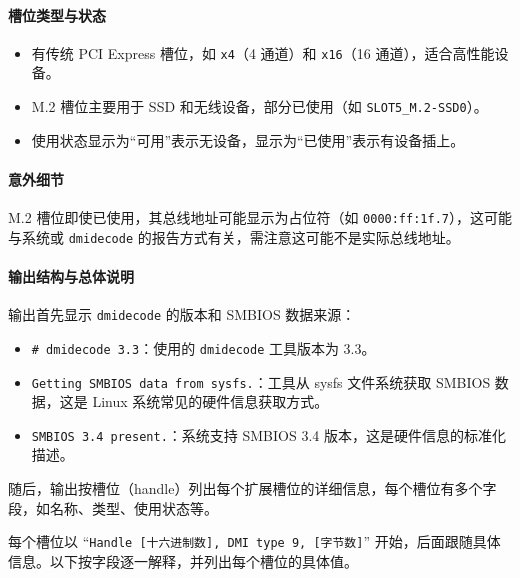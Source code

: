 \paragraph{槽位类型与状态}
\begin{itemize}
    \item 有传统 PCI Express 槽位，如 \texttt{x4}（4 通道）和 \texttt{x16}（16 通道），适合高性能设备。
    \item M.2 槽位主要用于 SSD 和无线设备，部分已使用（如 \texttt{SLOT5\_M.2-SSD0}）。
    \item 使用状态显示为“可用”表示无设备，显示为“已使用”表示有设备插上。
\end{itemize}

\paragraph{意外细节}
M.2 槽位即使已使用，其总线地址可能显示为占位符（如 \texttt{0000:ff:1f.7}），这可能与系统或 \texttt{dmidecode} 的报告方式有关，需注意这可能不是实际总线地址。


\paragraph{输出结构与总体说明}
输出首先显示 \texttt{dmidecode} 的版本和 SMBIOS 数据来源：
\begin{itemize}
    \item \texttt{\# dmidecode 3.3}：使用的 \texttt{dmidecode} 工具版本为 3.3。
    \item \texttt{Getting SMBIOS data from sysfs.}：工具从 sysfs 文件系统获取 SMBIOS 数据，这是 Linux 系统常见的硬件信息获取方式。
    \item \texttt{SMBIOS 3.4 present.}：系统支持 SMBIOS 3.4 版本，这是硬件信息的标准化描述。
\end{itemize}

随后，输出按槽位（handle）列出每个扩展槽位的详细信息，每个槽位有多个字段，如名称、类型、使用状态等。

每个槽位以 “\texttt{Handle [十六进制数], DMI type 9, [字节数]}” 开始，后面跟随具体信息。以下按字段逐一解释，并列出每个槽位的具体值。

